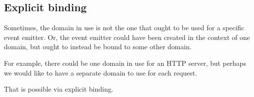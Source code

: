 \subsection{Explicit binding}\label{explicit-binding}

Sometimes, the domain in use is not the one that ought to be used for a
specific event emitter. Or, the event emitter could have been created in
the context of one domain, but ought to instead be bound to some other
domain.

For example, there could be one domain in use for an HTTP server, but
perhaps we would like to have a separate domain to use for each request.

That is possible via explicit binding.

\begin{Shaded}
\begin{Highlighting}[]
\OperatorTok{=} \NormalTok{(}\NormalTok{)}\OperatorTok{;}
\OperatorTok{=} \NormalTok{(}\NormalTok{)}\OperatorTok{;}
\OperatorTok{=}\NormalTok{()}\OperatorTok{;}


\end{Highlighting}
\end{Shaded}
